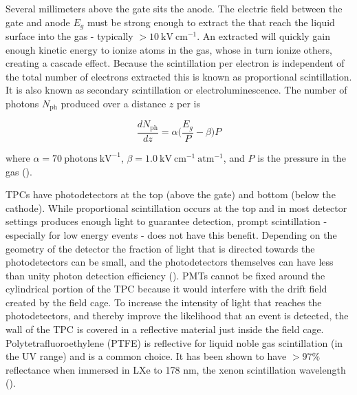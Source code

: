 Several millimeters above the gate sits the anode.  The electric field between the gate and anode $E_{g}$ must be strong
enough to extract the \electron that reach the liquid surface into the gas - typically $> 10\ \mathrm{kV\ cm^{-1}}$.  An extracted
\electron will quickly gain enough kinetic energy to ionize atoms in the gas,
whose \electron in turn ionize others, creating a cascade effect.  Because the scintillation per electron is independent of
the total number of electrons extracted this is known as proportional scintillation.  It is also known as secondary scintillation or
electroluminescence.  The number of photons $N_{\mathrm{ph}}$ produced over a distance $z$ per \electron is

\begin{equation}
\frac{dN_{\mathrm{ph}}}{dz} = \alpha \Big( \frac{E_{g}}{P} - \beta \Big) P
\label{eq:electronlum}
\end{equation}

\noindent where $\alpha = 70\ \mathrm{photons\ kV^{-1}}$, $\beta = 1.0\ \mathrm{kV\ cm^{-1}\ atm^{-1}}$, and $P$ is the pressure in the
gas ().

TPCs have photodetectors at the top (above the gate) and bottom (below the cathode).  While proportional scintillation occurs at the top
and in most detector settings produces enough light to guarantee detection, prompt scintillation - especially for low energy events - does
not have this benefit.  Depending on the geometry of the detector the fraction of light that is directed towards the photodetectors can
be small, and the photodetectors themselves can have less than unity photon detection efficiency ().  PMTs cannot
be fixed around the cylindrical portion of the TPC because it would interfere with the drift field created by the field cage.  To increase
the intensity of light that reaches the photodetectors, and thereby improve the likelihood that an event is
detected, the wall of the TPC is covered in a reflective material just inside the field cage.  Polytetrafluoroethylene (PTFE) is
reflective for liquid noble gas scintillation (in the UV range) and is a common choice.  It has been shown to have $> 97 \%$
reflectance when immersed in LXe to 178 nm, the xenon scintillation wavelength ().


